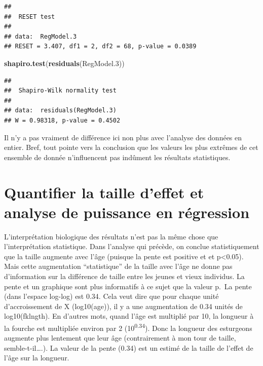 \documentclass[
  12pt,
]{book}
\newenvironment{Shaded}{\begin{snugshade}}{\end{snugshade}}
\newcommand{\FloatTok}[1]{\textcolor[rgb]{0.00,0.00,0.81}{#1}}
\newcommand{\KeywordTok}[1]{\textcolor[rgb]{0.13,0.29,0.53}{\textbf{#1}}}
\newcommand{\NormalTok}[1]{#1}
\begin{document}
\begin{verbatim}
## 
##  RESET test
## 
## data:  RegModel.3
## RESET = 3.407, df1 = 2, df2 = 68, p-value = 0.0389
\end{verbatim}

\begin{Shaded}
\begin{Highlighting}[]
\KeywordTok{shapiro.test}\NormalTok{(}\KeywordTok{residuals}\NormalTok{(RegModel}\FloatTok{.3}\NormalTok{))}
\end{Highlighting}
\end{Shaded}

\begin{verbatim}
## 
##  Shapiro-Wilk normality test
## 
## data:  residuals(RegModel.3)
## W = 0.98318, p-value = 0.4502
\end{verbatim}

Il n'y a pas vraiment de différence ici non plus avec l'analyse des données en entier. Bref, tout pointe vers la conclusion que les valeurs les plus extrêmes de cet ensemble de donnée n'influencent pas indûment les résultats statistiques.

\hypertarget{quantifier-la-taille-deffet-et-analyse-de-puissance-en-ruxe9gression}{%
\section{Quantifier la taille d'effet et analyse de puissance en régression}\label{quantifier-la-taille-deffet-et-analyse-de-puissance-en-ruxe9gression}}

L'interprétation biologique des résultats n'est pas la même chose que l'interprétation statistique. Dans l'analyse qui précède, on conclue statistiquement que la taille augmente avec l'âge (puisque la pente est positive et et p\textless0.05). Mais cette augmentation ``statistique'' de la taille avec l'âge ne donne pas d'information sur la différence de taille entre les jeunes et vieux individus. La pente et un graphique sont plus informatifs à ce sujet que la valeur p.~La pente (dans l'espace log-log) est 0.34. Cela veut dire que pour chaque unité d'accroissement de X (log10(age)), il y a une augmentation de 0.34 unités de log10(fklngth). En d'autres mots, quand l'âge est multiplié par 10, la longueur à la fourche est multipliée environ par 2 (10\textsuperscript{0.34}). Donc la longueur des esturgeons augmente plus lentement que leur âge (contrairement à mon tour de taille, semble-t-il\ldots.). La valeur de la pente (0.34) est un estimé de la taille de l'effet de l'âge sur la longueur.
\end{document}
